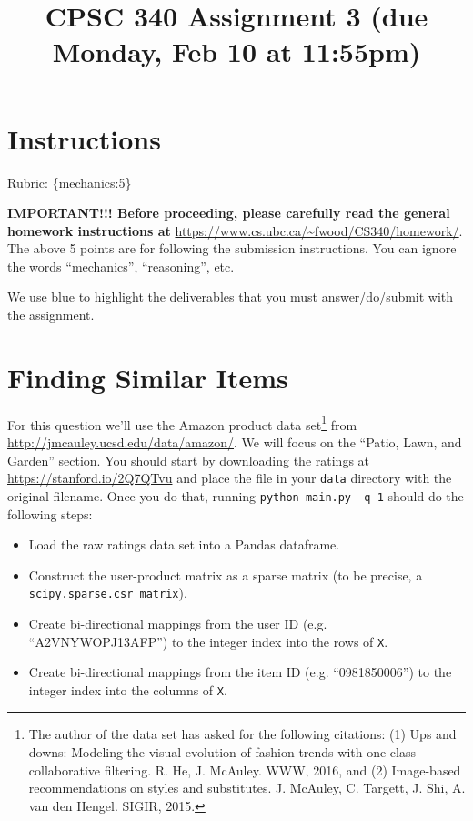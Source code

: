 \documentclass{article}
\def\rubric#1{\gre{Rubric: \{#1\}}}{}
\def\blu#1{{\color{blu}#1}}
\def\gre#1{{\color{gre}#1}}
\begin{document}
\title{CPSC 340 Assignment 3 (due Monday, Feb 10 at 11:55pm)}
\date{}
\maketitle

\vspace{-7em}

\section*{Instructions}
\rubric{mechanics:5}

\textbf{IMPORTANT!!! Before proceeding, please carefully read the general homework instructions at} \url{https://www.cs.ubc.ca/~fwood/CS340/homework/}. The above 5 points are for following the submission instructions. You can ignore the words ``mechanics'', ``reasoning'', etc.

\vspace{1em}
We use \blu{blue} to highlight the deliverables that you must answer/do/submit with the assignment.


\section{Finding Similar Items}

For this question we'll use the Amazon product data set\footnote{The author of the data set has asked for the following citations: (1) Ups and downs: Modeling the visual evolution of fashion trends with one-class collaborative filtering. R. He, J. McAuley. WWW, 2016, and (2) Image-based recommendations on styles and substitutes. J. McAuley, C. Targett, J. Shi, A. van den Hengel. SIGIR, 2015.} from \url{http://jmcauley.ucsd.edu/data/amazon/}. We will focus on the ``Patio, Lawn, and Garden'' section. You should start by downloading the ratings at \\
\url{https://stanford.io/2Q7QTvu} and place the file in your \texttt{data} directory with the original filename. Once you do that, running \texttt{python main.py -q 1} should do the following steps:

\begin{itemize}
\item Load the raw ratings data set into a Pandas dataframe.
\item Construct the user-product matrix as a sparse matrix (to be precise, a \verb|scipy.sparse.csr_matrix|).
\item Create bi-directional mappings from the user ID (e.g. ``A2VNYWOPJ13AFP'') to the integer index into the rows of \texttt{X}.
\item Create bi-directional mappings from the item ID (e.g. ``0981850006'') to the integer index into the columns of \texttt{X}.
\end{itemize}
\end{document}
